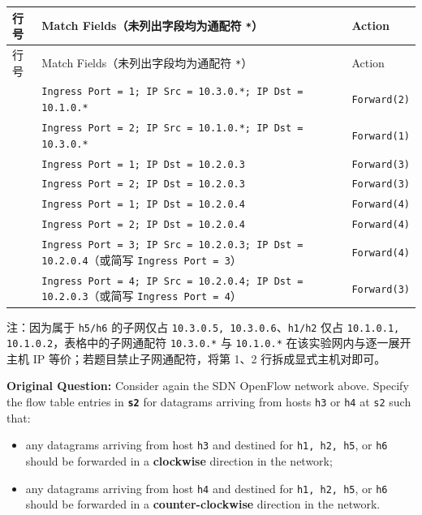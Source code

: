 \begingroup\small\setlength{\tabcolsep}{3pt}\renewcommand{\arraystretch}{1.20}
\begin{longtable}{@{}>{\raggedright\arraybackslash}p{}>{\raggedright\arraybackslash}p{}>{\raggedright\arraybackslash}p{}@{}}
\toprule
行号 & Match Fields（未列出字段均为通配符 \texttt{*}） & Action \\
\midrule\endfirsthead
行号 & Match Fields（未列出字段均为通配符 \texttt{*}） & Action \\
\midrule\endhead
\bottomrule\endfoot
1 & \texttt{Ingress Port = 1; IP Src = 10.3.0.*; IP Dst = 10.1.0.*} & \texttt{Forward(2)} \\
2 & \texttt{Ingress Port = 2; IP Src = 10.1.0.*; IP Dst = 10.3.0.*} & \texttt{Forward(1)} \\
3 & \texttt{Ingress Port = 1; IP Dst = 10.2.0.3} & \texttt{Forward(3)} \\
4 & \texttt{Ingress Port = 2; IP Dst = 10.2.0.3} & \texttt{Forward(3)} \\
5 & \texttt{Ingress Port = 1; IP Dst = 10.2.0.4} & \texttt{Forward(4)} \\
6 & \texttt{Ingress Port = 2; IP Dst = 10.2.0.4} & \texttt{Forward(4)} \\
7 & \texttt{Ingress Port = 3; IP Src = 10.2.0.3; IP Dst = 10.2.0.4}（或简写 \texttt{Ingress Port = 3}） & \texttt{Forward(4)} \\
8 & \texttt{Ingress Port = 4; IP Src = 10.2.0.4; IP Dst = 10.2.0.3}（或简写 \texttt{Ingress Port = 4}） & \texttt{Forward(3)} \\
\end{longtable}\endgroup
注：因为属于 \texttt{h5/h6} 的子网仅占 \texttt{10.3.0.5, 10.3.0.6}、\texttt{h1/h2} 仅占 \texttt{10.1.0.1, 10.1.0.2}，表格中的子网通配符 \texttt{10.3.0.*} 与 \texttt{10.1.0.*} 在该实验网内与逐一展开主机 IP 等价；若题目禁止子网通配符，将第 1、2 行拆成显式主机对即可。



\textbf{Original Question:} Consider again the SDN OpenFlow network above. Specify the flow table entries in \textbf{\texttt{s2}} for datagrams arriving from hosts \texttt{h3} or \texttt{h4} at \texttt{s2} such that:
\begin{itemize}
\item any datagrams arriving from host \texttt{h3} and destined for \texttt{h1, h2, h5}, or \texttt{h6} should be forwarded in a \textbf{clockwise} direction in the network;
\item any datagrams arriving from host \texttt{h4} and destined for \texttt{h1, h2, h5}, or \texttt{h6} should be forwarded in a \textbf{counter-clockwise} direction in the network.
\end{itemize}

